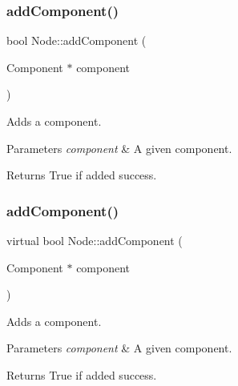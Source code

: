 \subsubsection{\texorpdfstring{add\+Component()}{addComponent()}\hspace{0.1cm}{\footnotesize\ttfamily [1/2]}}
{\footnotesize\ttfamily bool Node\+::add\+Component (\begin{DoxyParamCaption}\item[{Component $\ast$}]{component }\end{DoxyParamCaption})\hspace{0.3cm}{\ttfamily [virtual]}}

Adds a component.


\begin{DoxyParams}{Parameters}
{\em component} & A given component. \\
\hline
\end{DoxyParams}
\begin{DoxyReturn}{Returns}
True if added success. 
\end{DoxyReturn}
\mbox{\label{classNode_a1c19037b621c89b205fdb3ad620b1f8d}} 
\subsubsection{\texorpdfstring{add\+Component()}{addComponent()}\hspace{0.1cm}{\footnotesize\ttfamily [2/2]}}
{\footnotesize\ttfamily virtual bool Node\+::add\+Component (\begin{DoxyParamCaption}\item[{Component $\ast$}]{component }\end{DoxyParamCaption})\hspace{0.3cm}{\ttfamily [virtual]}}

Adds a component.


\begin{DoxyParams}{Parameters}
{\em component} & A given component. \\
\hline
\end{DoxyParams}
\begin{DoxyReturn}{Returns}
True if added success. 
\end{DoxyReturn}
\mbox{\label{classNode_a7744d16609dfc7609e889129b8672afb}} 
